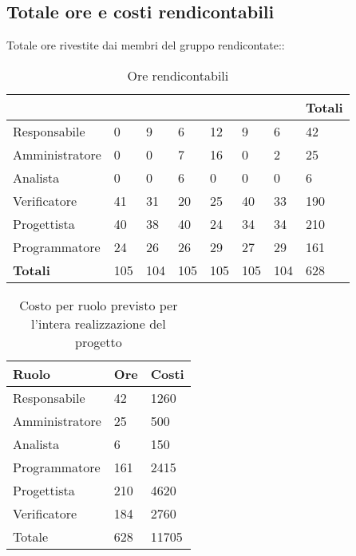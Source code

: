 {}

\subsection{Totale ore e costi rendicontabili}{
\label{totOreRendi}
				Totale ore rivestite dai membri del gruppo rendicontate::
		\begin{table}[H] %
			\begin{tabular}{|p{}|p{}
												p{\dimexpr 0.12\linewidth-2\tabcolsep}p{}
												p{}p{}
												p{} || p{}|}
				 		\hline
		 		 & \TP & \VG & \FM & \BM & \PM & \GP& \textbf{Totali} \\
		 		 \hline
				 Responsabile & 0 & 9 & 6 & 12 & 9 & 6 & 42\\
				 \hline
				 Amministratore & 0 & 0 & 7 & 16 & 0 & 2 & 25\\
				 \hline
				 Analista & 0 & 0 & 6 & 0 & 0 & 0 & 6\\
				 \hline
				 Verificatore & 41 & 31 & 20 & 25 & 40 & 33 & 190 \\
				 \hline
				 Progettista & 40 & 38 & 40 & 24 & 34 & 34 & 210\\
				 \hline
				 Programmatore & 24 & 26 & 26 & 29 & 27 & 29 & 161\\
				 \hline \hline
				\textbf{Totali} & 105 & 104 & 105 & 105 & 105 & 104 & 628\\
				\hline
			\end{tabular}
			\caption{Ore rendicontabili}
			\label{tab:rendicontabili}
		\end{table}

}
		
	\begin{table}[H]
	 \centering
	 \begin{tabular}{p{}p{}
		  	  		  				p{}}
	  \toprule Ruolo & Ore  & Costi \\
	  \midrule
	  Responsabile & 42  & 1260 \\
	  Amministratore & 25 & 500 \\
	  Analista & 6 & 150 \\
	  Programmatore & 161  & 2415 \\
	  Progettista & 210  & 4620 \\
	  Verificatore & 184  & 2760 \\
	  \hline
	  Totale & 628  & 11705 \\
	  \bottomrule
	 \end{tabular}
	 \label{tab:costorendicontato}
	 \caption{Costo per ruolo previsto per l’intera realizzazione del progetto}
	\end{table}

